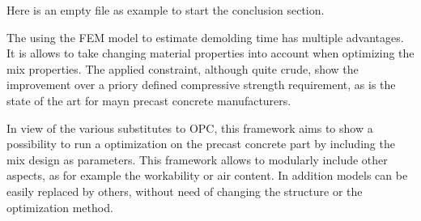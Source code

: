 Here is an empty file as example to start the conclusion section.


The using the FEM model to estimate demolding time has multiple advantages.
It is allows to take changing material properties into account when optimizing the mix properties.
The applied constraint, although quite crude, show the improvement over a priory defined compressive strength requirement, as is the state of the art for mayn precast concrete manufacturers.



In view of the various substitutes to OPC, this framework aims to show a possibility to run a optimization on the precast concrete part by including the mix design as parameters.
This framework allows to modularly include other aspects, as for example the workability or air content.
In addition models can be easily replaced by others, without need of changing the structure or the optimization method.

